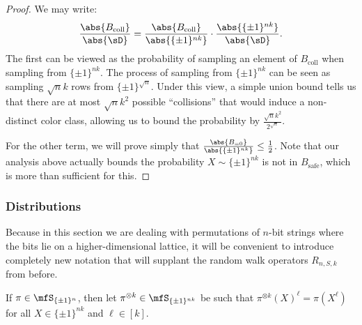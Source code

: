 \begin{proof}
We may write:
\begin{equation*}
    \frac{\abs{B_{\mathrm{coll}}}}{\abs{\sD}} = \frac{\abs{B_{\mathrm{coll}}}}{\abs{\{\pm1\}^{nk}}} \cdot \frac{\abs{\{\pm1\}^{nk}}}{\abs{\sD}}.
\end{equation*}
The first can be viewed as the probability of sampling an element of $B_{\mathrm{coll}}$ when sampling from $\{\pm1\}^{nk}$. The process of sampling from $\{\pm1\}^{nk}$ can be seen as sampling $\sqrt{n}k$ rows from $\{\pm1\}^{\sqrt{n}}$. Under this view, a simple union bound tells us that there are at most $\sqrt{n}k^2$ possible ``collisions'' that would induce a non-distinct color class, allowing us to bound the probability by $\frac{\sqrt{n}k^2}{2^{\sqrt{n}}}$.

For the other term, we will prove simply that $\frac{\abs{B_{=0}}}{\abs{\{\pm1\}^{nk}}} \leq \frac{1}{2}$. Note that our analysis above actually bounds the probability $X \sim \{\pm1\}^{nk}$ is not in $B_{\mathrm{safe}}$, which is more than sufficient for this. \end{proof}


\subsubsection{Distributions}
\label{subsec:distributions}
Because in this section we are dealing with permutations of $n$-bit strings where the bits lie on a higher-dimensional lattice, it will be convenient to introduce completely new notation that will supplant the random walk operators $R_{n,S,k}$ from before.

If $\pi \in \mfS_{\{\pm1\}^{n}}$, then let $\pi^{\otimes k} \in \mfS_{\{\pm1\}^{nk}}$ be such that $\pi^{\otimes k}(X)^\ell = \pi(X^\ell)$ for all $X \in \{\pm1\}^{nk}$ and $\ell \in [k]$. 

